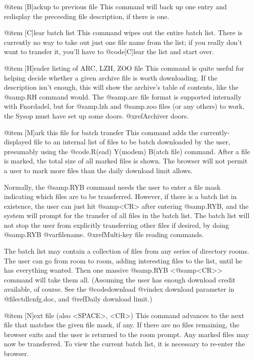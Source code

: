 @item [B]ackup to previous file
This command will back up one entry and redisplay the preceeding file
description, if there is one.

@item [C]lear batch list
This command wipes out the entire batch list.  There is
currently no way to take out just one file name from the list; if
you really don't want to transfer it, you'll have to @code{[C]lear} the
list and start over.

@item [H]eader listing of ARC, LZH, ZOO file
This command is quite useful for helping decide whether a given archive
file is worth downloading.  If the description isn't enough, this will
show the archive's table of contents, like the @samp{.RH} command would.
The @samp{.arc} file format is supported internally with Fnordadel, but
for @samp{.lzh} and @samp{.zoo} files (or any others) to work, the Sysop
must have set up some doors.  @xref{Archiver doors}.

@item [M]ark this file for batch transfer
This command adds the currently-displayed file to an internal
list of files to be batch downloaded by the user, presumably using
the @code{.R(ead) Y(modem) B(atch file)} command.  After a file is marked,
the total size of all marked files is shown.  The browser will not permit
a user to mark more files than the daily download limit allows.

Normally, the @samp{.RYB} command
needs the user to enter a file mask indicating which files are to be
transferred.  However, if there is a batch list in existence, the
user can just hit @samp{<CR>} after entering @samp{.RYB},
and the system will prompt
for the transfer of all files in the batch list.  The batch list will
not stop the user from explicitly transferring other files if desired,
by doing @samp{.RYB @var{filename}}.  @xref{Multi-key file reading commands}.

The batch list may contain a collection of files from any
series of directory rooms.  The user can go from room to room, adding
interesting files to the list, until he has everything wanted.  Then
one massive @samp{.RYB <@samp{<CR>}>} command will take them all.
(Assuming the user has enough download credit available, of course.  See
the @code{download}
@vindex download
parameter in @file{ctdlcnfg.doc}, and @ref{Daily download limit}.)

@item [N]ext file (also <SPACE>, <CR>)
This command advances to the next file that matches the given
file mask, if any.  If there are no files remaining, the browser
exits and the user is returned to the room prompt.  Any marked files
may now be transferred.  To view the current batch list, it is
necessary to re-enter the browser.

